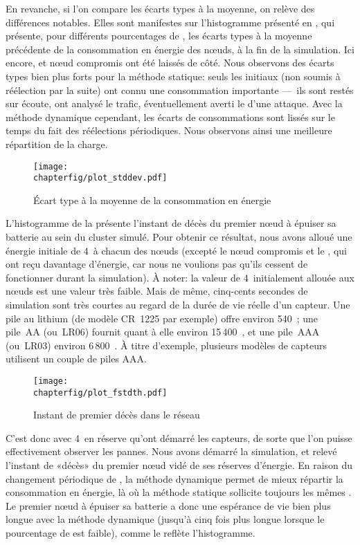 En revanche, si l'on compare les écarts types à la moyenne, on relève des différences notables.
Elles sont manifestes sur l'histogramme présenté en , qui présente, pour différents pourcentages de \cns, les écarts types à la moyenne précédente de la consommation en énergie des nœuds, à la fin de la simulation.
Ici encore, \ch et nœud compromis ont été laissés de côté.
Nous observons des écarts types bien plus forts pour la méthode statique: seuls les \cns initiaux (non soumis à réélection par la suite) ont connu une consommation importante ---~ils sont restés sur écoute, ont analysé le trafic, éventuellement averti le \ch d'une attaque.
Avec la méthode dynamique cependant, les écarts de consommations sont lissés sur le temps du fait des réélections périodiques.
Nous observons ainsi une meilleure répartition de la charge.
\begin{figure}[ht]
    \centering
    \texttt{[image: \\chapterfig/plot\_stddev.pdf]}
    \caption{Écart type à la moyenne de la consommation en énergie}\label{sa:fig:conso-ecart-type}
\end{figure}

L'histogramme de la  présente l'instant de décès du premier nœud à épuiser sa batterie au sein du cluster simulé.
Pour obtenir ce résultat, nous avons alloué une énergie initiale de 4~\joule à chacun des nœuds (excepté le nœud compromis et le \ch, qui ont reçu davantage d'énergie, car nous ne voulions pas qu'ils cessent de fonctionner durant la simulation).
À noter: la valeur de 4~\joule initialement allouée aux nœuds est une valeur très faible.
Mais de même, cinq-cents secondes de simulation sont très courtes au regard de la durée de vie réelle d'un capteur.
Une pile au lithium (de modèle CR~1225 par exemple) offre environ 540~\joule; une pile~AA (ou~LR06) fournit quant à elle environ 15\,400~\joule, et une pile~AAA (ou~LR03) environ 6\,800~\joule.
À titre d'exemple, plusieurs modèles de capteurs utilisent un couple de piles AAA.
\begin{figure}[ht]
    \centering
    \texttt{[image: \\chapterfig/plot\_fstdth.pdf]}
    \caption{Instant de premier décès dans le réseau}\label{sa:fig:premier-deces}
\end{figure}
%

C'est donc avec 4~\joule en réserve qu'ont démarré les capteurs, de sorte que l'on puisse effectivement observer les pannes.
Nous avons démarré la simulation, et relevé l'instant de «décès» du premier nœud vidé de ses réserves d'énergie.
En raison du changement périodique de \cns, la méthode dynamique permet de mieux répartir la consommation en énergie, là où la méthode statique sollicite toujours les mêmes \cns.
Le premier nœud à épuiser sa batterie a donc une espérance de vie bien plus longue avec la méthode dynamique (jusqu'à cinq fois plus longue lorsque le pourcentage de \cns est faible), comme le reflète l'histogramme.

